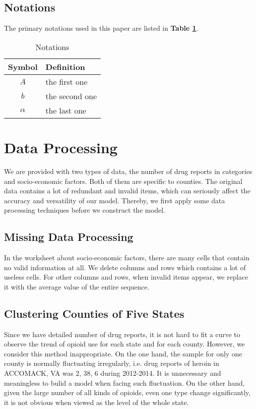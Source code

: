 \documentclass[12pt]{article}
\begin{document}
\subsection{Notations}
The primary notations used in this paper are listed in \textbf{Table \ref{tb:notation}}.
\begin{table}[!htbp]
\begin{center}
\caption{Notations}
\begin{tabular}{cl}
	\toprule
	\multicolumn{1}{m{3cm}}{\centering Symbol}
	&\multicolumn{1}{m{8cm}}{\centering Definition}\\
	\midrule
	$A$&the first one\\
	$b$&the second one\\
	$\alpha$ &the last one\\
	\bottomrule
\end{tabular}\label{tb:notation}
\end{center}
\end{table}

\section{Data Processing}
We are provided with two types of data, the number of drug reports in categories and socio-economic factors. Both of them are specific to counties. The original data contains a lot of redundant and invalid items, which can seriously affect the accuracy and versatility of our model. Thereby, we first apply some data processing techniques before we construct the model.
\subsection{Missing Data Processing}
In the worksheet about socio-economic factors, there are many cells that contain no valid information at all. We delete columns and rows which contains a lot of useless cells. For other columns and rows, when invalid items appear, we replace it with the average value of the entire sequence.

\subsection{Clustering Counties of Five States}
Since we have detailed number of drug reports, it is not hard to fit a curve to observe the trend of opioid use for each state and for each county. However, we consider this method inappropriate. On the one hand, the sample for only one county is normally fluctuating irregularly, i.e. drug reports of heroin in ACCOMACK, VA was 2, 38, 6 during 2012-2014. It is unnecessary and meaningless to bulid a model when facing such fluctuation. On the other hand, given the large number of all kinds of opioids, even one type change significantly, it is not obvious when viewed as the level of the whole state.
\end{document}
